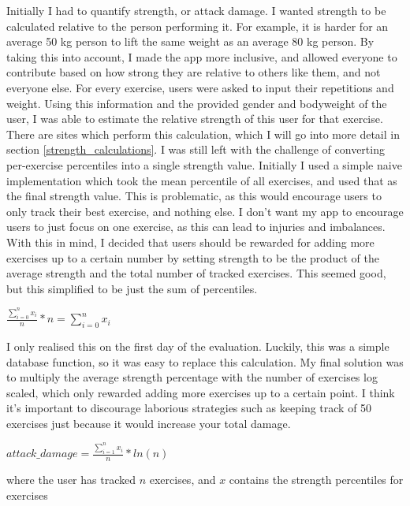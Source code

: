 \documentclass{l4proj}
\begin{document}
Initially I had to quantify strength, or attack damage. I wanted strength to be calculated relative to the person performing it. For example, it is harder for an average 50 kg person to lift the same weight as an average 80 kg person. By taking this into account, I made the app more inclusive, and allowed everyone to contribute based on how strong they are relative to others like them, and not everyone else. For every exercise, users were asked to input their repetitions and weight. Using this information and the provided gender and bodyweight of the user, I was able to estimate the relative strength of this user for that exercise. There are sites which perform this calculation, which I will go into more detail in section \ref{strength_calculations}. I was still left with the challenge of converting per-exercise percentiles into a single strength value. Initially I used a simple naive implementation which took the mean percentile of all exercises, and used that as the final strength value. This is problematic, as this would encourage users to only track their best exercise, and nothing else. I don't want my app to encourage users to just focus on one exercise, as this can lead to injuries and imbalances. With this in mind, I decided that users should be rewarded for adding more exercises up to a certain number by setting strength to be the product of the average strength and the total number of tracked exercises. This seemed good, but this simplified to be just the sum of percentiles.

\begin{algorithm}[H]
  $\frac{\sum_{i=0}^{n} x_i}{n} * n = {\sum_{i=0}^{n} x_i}$
\end{algorithm}

I only realised this on the first day of the evaluation. Luckily, this was a simple database function, so it was easy to replace this calculation. 
My final solution was to multiply the average strength percentage with the number of exercises log scaled, which only rewarded adding more exercises up to a certain point. I think it's important to discourage laborious strategies such as keeping track of 50 exercises just because it would increase your total damage. 

\begin{algorithm}
  $attack\_damage = \frac{\sum_{i=1}^{n} x_i}{n} * ln(n) $

  where the user has tracked $n$ exercises, and $x$ contains the strength percentiles for exercises 
\end{algorithm}
\end{document}
